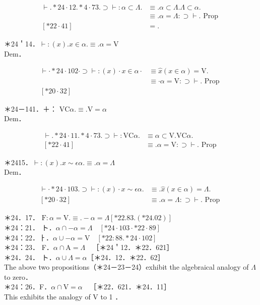 \documentclass[10pt]{article}
\begin{document}
$$
\begin{aligned}
\vdash . * 24 \cdot 12 . * 4 \cdot 73 . \supset \vdash: \alpha \subset \Lambda . & \equiv . \alpha \subset \Lambda . \Lambda \subset \alpha . \\
& \equiv . \alpha=\Lambda: \supset \vdash . \text { Prop } \\
{[* 22 \cdot 41] } & =.
\end{aligned}
$$

＊24＇14．$\vdash:(x) . x \in \alpha . \equiv . \alpha=\mathrm{V}$\\
Dem．

$$
\begin{aligned}
\vdash \cdot * 24 \cdot 102 \cdot \supset \vdash:(x) \cdot x \in \alpha \cdot & \equiv \hat{x}(x \in \alpha)=\mathrm{V} . \\
& \equiv \cdot \alpha=\mathrm{V}: \supset \vdash . \text { Prop } \\
{[* 20 \cdot 32] } &
\end{aligned}
$$

＊24－141．＋： $\mathrm{VC} \alpha . \equiv . \mathrm{V}=\alpha$\\
Dem．

$$
\begin{aligned}
\vdash . * 24 \cdot 11 . * 4 \cdot 73 . \supset \vdash: \mathrm{VC} \alpha . & \equiv \alpha \subset \mathrm{V} . \mathrm{VC} \alpha . \\
{[* 22 \cdot 41] } & \equiv . \alpha=\mathrm{V}: \supset \vdash . \text { Prop }
\end{aligned}
$$

＊2415．$\vdash:(x) . x \sim \epsilon \alpha . \equiv . \alpha=\Lambda$\\
Dem．

$$
\begin{aligned}
\vdash \cdot * 24 \cdot 103 . \supset \vdash:(x) \cdot x \sim \epsilon \alpha . & \equiv . \hat{x}(x \in \alpha)=\Lambda . \\
{[* 20 \cdot 32] } & \equiv . \alpha=\Lambda: \supset \vdash . \text { Prop }
\end{aligned}
$$

＊24．17． $\mathrm{F}: \alpha=\mathrm{V} . \equiv .-\alpha=\Lambda[* 22.83 .(* 24.02)]$\\
＊24：21． ト．$\alpha \cap-\alpha=\Lambda \quad[* 24 \cdot 103 \cdot * 22 \cdot 89]$\\
＊24：22．ㅏ．$\alpha \cup-\alpha=\mathrm{V} \quad[* 22: 88 . * 24 \cdot 102]$\\
＊24：23． F．$\alpha \cap \mathrm{A}=\Lambda \quad$［＊24＇12．＊22．621］\\
＊24．24． ト．$\alpha \cup \Lambda=\alpha$［＊24．12．＊22．62］\\
The above two propositions（＊24－23－24）exhibit the algebraical analogy of $\Lambda$ to zero．\\
＊24：26．F．$\alpha \cap \mathrm{V}=\alpha \quad$［＊22．621．＊24．11］\\
This exhibits the analogy of V to 1 ．
\end{document}
